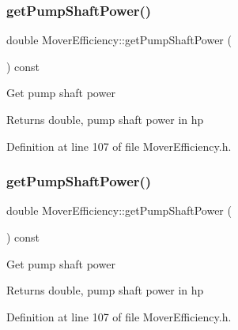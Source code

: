 \mbox{\label{class_mover_efficiency_a367c3cb3a070cef9de5e3ca87bbf62fe}} 
\subsubsection{\texorpdfstring{get\+Pump\+Shaft\+Power()}{getPumpShaftPower()}\hspace{0.1cm}{\footnotesize\ttfamily [2/3]}}
{\footnotesize\ttfamily double Mover\+Efficiency\+::get\+Pump\+Shaft\+Power (\begin{DoxyParamCaption}{ }\end{DoxyParamCaption}) const\hspace{0.3cm}{\ttfamily [inline]}}

Get pump shaft power \begin{DoxyReturn}{Returns}
double, pump shaft power in hp 
\end{DoxyReturn}


Definition at line 107 of file Mover\+Efficiency.\+h.

\mbox{\label{class_mover_efficiency_a367c3cb3a070cef9de5e3ca87bbf62fe}} 
\subsubsection{\texorpdfstring{get\+Pump\+Shaft\+Power()}{getPumpShaftPower()}\hspace{0.1cm}{\footnotesize\ttfamily [3/3]}}
{\footnotesize\ttfamily double Mover\+Efficiency\+::get\+Pump\+Shaft\+Power (\begin{DoxyParamCaption}{ }\end{DoxyParamCaption}) const\hspace{0.3cm}{\ttfamily [inline]}}

Get pump shaft power \begin{DoxyReturn}{Returns}
double, pump shaft power in hp 
\end{DoxyReturn}


Definition at line 107 of file Mover\+Efficiency.\+h.

